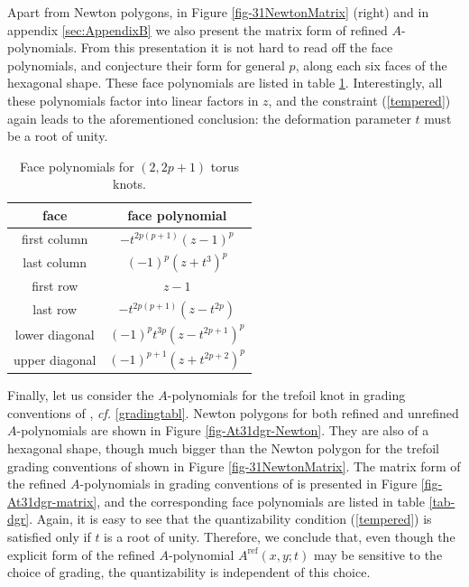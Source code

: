 \documentclass[hyper,letterpaper]{JHEP3}
\begin{document}
Apart from Newton polygons, in Figure \ref{fig-31NewtonMatrix} (right)
and in appendix \ref{sec:AppendixB} we also present the matrix form of refined $A$-polynomials. From this
presentation it is not hard to read off the face polynomials, and conjecture their form for general $p$,
along each six faces of the hexagonal shape. These face polynomials are listed in table \ref{tab-torus}.
Interestingly, all these polynomials factor into linear factors in $z$,
and the constraint (\ref{tempered}) again leads to the aforementioned conclusion:
the deformation parameter $t$ must be a root of unity.

\begin{table}[ht]
\centering
\begin{tabular}{| c || c | }
\hline
\rule{0pt}{5mm}
face & face polynomial \\[3pt]
\hline
\rule{0pt}{5mm}
first column & $-t^{2p(p+1)} (z-1)^p$ \\[3pt]
last column & $(-1)^p (z+t^3)^p$  \\[3pt]
first row & $z-1$    \\[3pt]
last row & $-t^{2p(p+1)} (z-t^{2p})$  \\[3pt]
lower diagonal & $(-1)^p  t^{3p} (z - t^{2p+1})^p$  \\[3pt]
upper diagonal & $(-1)^{p+1} (z + t^{2p+2})^p$  \\[3pt]
\hline
\end{tabular}
\caption{Face polynomials for $(2,2p+1)$ torus knots.}   \label{tab-torus}
\end{table}

Finally, let us consider the $A$-polynomials for the trefoil knot in
 grading conventions of \cite{DGR}, {\it cf.} \eqref{gradingtabl}.
Newton polygons for both refined and unrefined $A$-polynomials are shown in Figure \ref{fig-At31dgr-Newton}.
They are also of a hexagonal shape, though much bigger than the Newton polygon for the trefoil grading conventions of \cite{GS}
shown in Figure \ref{fig-31NewtonMatrix}.
The matrix form of the refined $A$-polynomials in grading conventions of \cite{DGR} is presented in Figure \ref{fig-At31dgr-matrix},
and the corresponding face polynomials are listed in table \ref{tab-dgr}.
Again, it is easy to see that the quantizability condition (\ref{tempered}) is satisfied only if $t$ is a root of unity.
Therefore, we conclude that, even though the explicit form of the refined $A$-polynomial $A^{\text{ref}} (x,y;t)$
may be sensitive to the choice of grading, the quantizability is independent of this choice.
\end{document}
